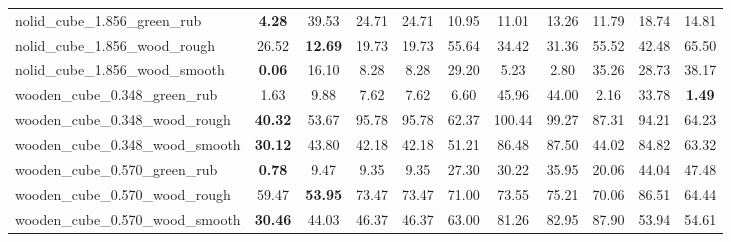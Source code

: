 \begin{table}[H]
{\begin{tabular}{l cccccccccc}
        nolid\_cube\_1.856\_green\_rub & \textbf{4.28} & 39.53 & 24.71 & 24.71 & 10.95 & 11.01 & 13.26 & 11.79 & 18.74 & 14.81 \\
        nolid\_cube\_1.856\_wood\_rough & 26.52 & \textbf{12.69} & 19.73 & 19.73 & 55.64 & 34.42 & 31.36 & 55.52 & 42.48 & 65.50 \\
        nolid\_cube\_1.856\_wood\_smooth & \textbf{0.06} & 16.10 & 8.28 & 8.28 & 29.20 & 5.23 & 2.80 & 35.26 & 28.73 & 38.17 \\
        wooden\_cube\_0.348\_green\_rub & 1.63 & 9.88 & 7.62 & 7.62 & 6.60 & 45.96 & 44.00 & 2.16 & 33.78 & \textbf{1.49} \\
        wooden\_cube\_0.348\_wood\_rough & \textbf{40.32} & 53.67 & 95.78 & 95.78 & 62.37 & 100.44 & 99.27 & 87.31 & 94.21 & 64.23 \\
        wooden\_cube\_0.348\_wood\_smooth & \textbf{30.12} & 43.80 & 42.18 & 42.18 & 51.21 & 86.48 & 87.50 & 44.02 & 84.82 & 63.32 \\
        wooden\_cube\_0.570\_green\_rub & \textbf{0.78} & 9.47 & 9.35 & 9.35 & 27.30 & 30.22 & 35.95 & 20.06 & 44.04 & 47.48 \\
        wooden\_cube\_0.570\_wood\_rough & 59.47 & \textbf{53.95} & 73.47 & 73.47 & 71.00 & 73.55 & 75.21 & 70.06 & 86.51 & 64.44 \\
        wooden\_cube\_0.570\_wood\_smooth & \textbf{30.46} & 44.03 & 46.37 & 46.37 & 63.00 & 81.26 & 82.95 & 87.90 & 53.94 & 54.61 \\
        \bottomrule
    \end{tabular}
    }
\end{table}
